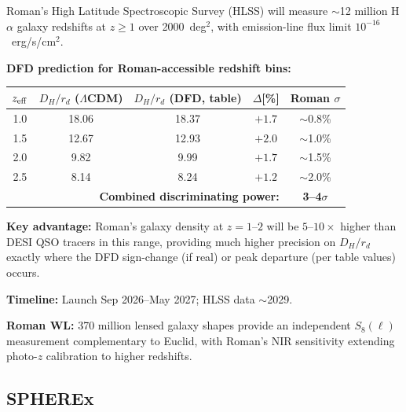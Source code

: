 \documentclass[11pt,a4paper]{article}
\newcommand{\LCDM}{$\Lambda$CDM}
\begin{document}
\begin{newbox}[Prediction ROM1: Roman HLSS BAO at $z = 1$--$3$ (NEW)]

Roman's High Latitude Spectroscopic Survey (HLSS) will measure
$\sim$12 million H$\alpha$ galaxy redshifts at $z \geq 1$ over
2000~deg$^2$, with emission-line flux limit $10^{-16}$~erg/s/cm$^2$.

\textbf{DFD prediction for Roman-accessible redshift bins:}

\begin{center}
\begin{tabular}{ccccc}
\toprule
$z_{\rm eff}$ & $D_H/r_d$ (\LCDM) & $D_H/r_d$ (DFD, table) &
$\Delta$[\%] & Roman $\sigma$ \\
\midrule
1.0 & 18.06 & 18.37 & $+1.7$ & $\sim$0.8\% \\
1.5 & 12.67 & 12.93 & $+2.0$ & $\sim$1.0\% \\
2.0 & 9.82 & 9.99 & $+1.7$ & $\sim$1.5\% \\
2.5 & 8.14 & 8.24 & $+1.2$ & $\sim$2.0\% \\
\midrule
\multicolumn{4}{r}{\textbf{Combined discriminating power:}} &
\textbf{3--4$\sigma$} \\
\bottomrule
\end{tabular}
\end{center}

\textbf{Key advantage:} Roman's galaxy density at $z = 1$--$2$ will be
$5$--$10\times$ higher than DESI QSO tracers in this range, providing
much higher precision on $D_H/r_d$ exactly where the DFD sign-change
(if real) or peak departure (per table values) occurs.

\textbf{Timeline:} Launch Sep 2026--May 2027; HLSS data $\sim$2029.

\textbf{Roman WL:} 370 million lensed galaxy shapes provide an independent
$S_8(\ell)$ measurement complementary to Euclid, with Roman's NIR
sensitivity extending photo-$z$ calibration to higher redshifts.
\end{newbox}

\subsection{SPHEREx}
\end{document}
